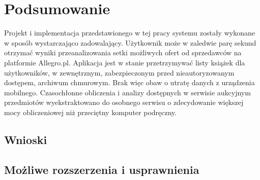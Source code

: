 \chapter{Podsumowanie}
\label{cha:podsumowanie}

Projekt i implementacja przedstawionego w tej pracy systemu zostały wykonane w sposób wystarczająco zadowalający. Użytkownik może w zaledwie parę sekund otrzymać wyniki przeanalizowania setki możliwych ofert od sprzedawców na platformie Allegro.pl. Aplikacja jest w stanie przetrzymywać listy książek dla użytkowników, w zewnętrznym, zabezpieczonym przed nieautoryzowanym dostępem, archiwum chmurowym. Brak więc obaw o utratę danych z urządzenia mobilnego. Czasochłonne obliczenia i analizy dostępnych w serwisie aukcyjnym przedmiotów wyekstraktowano do osobnego serwisu o zdecydowanie większej mocy obliczeniowej niż przeciętny komputer podręczny.

\section{Wnioski}

\section{Możliwe rozszerzenia i usprawnienia}